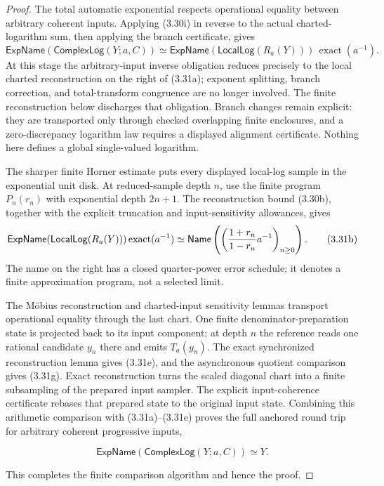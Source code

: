\documentclass[10pt]{article}
\theoremstyle{definition}
\theoremstyle{remark}
\begin{document}
\begin{proof}
The total automatic exponential respects operational equality between
arbitrary coherent inputs.  Applying (3.30i) in reverse to the actual charted-logarithm
sum, then applying the branch certificate, gives
\[
 \mathsf{ExpName}(\mathsf{ComplexLog}(Y;a,C))
 \simeq
 \mathsf{ExpName}(\mathsf{LocalLog}(R_a(Y)))\,\operatorname{exact}(a^{-1}).
 \tag{3.31a}
\]
At this stage the arbitrary-input inverse obligation reduces precisely to the
local charted reconstruction on the right of (3.31a); exponent splitting,
branch correction, and total-transform congruence are no longer involved.
The finite reconstruction below discharges that obligation.  Branch changes
remain explicit: they are transported only through checked overlapping
finite enclosures, and a zero-discrepancy logarithm law requires a displayed
alignment certificate.  Nothing here defines a global single-valued
logarithm.

The sharper finite Horner estimate puts every displayed local-log sample in
the exponential unit disk.  At reduced-sample depth $n$, use the finite
program $P_n(r_n)$ with exponential depth $2n+1$.  The reconstruction bound
(3.30b), together with the explicit truncation and input-sensitivity
allowances, gives
\[
 \mathsf{ExpName}(\mathsf{LocalLog}(R_a(Y)))
       \operatorname{exact}(a^{-1})
 \simeq
 \mathsf{Name}\left(
   \left({1+r_n\over1-r_n}a^{-1}\right)_{n\ge0}
 \right).
 \tag{3.31b}
\]
The name on the right has a closed quarter-power error schedule; it denotes a
finite approximation program, not a selected limit.

The M\"obius reconstruction and charted-input sensitivity lemmas transport
operational equality through the last chart.  One finite
denominator-preparation state is projected back to its input component; at
depth $n$ the reference reads one rational candidate $y_n$ there and emits
$T_a(y_n)$.  The exact synchronized reconstruction lemma gives (3.31e), and
the asynchronous quotient comparison gives (3.31g).  Exact reconstruction
turns the scaled diagonal chart into a finite
subsampling of the prepared input sampler.  The explicit input-coherence
certificate rebases that prepared state to the original input state.  Combining
this arithmetic comparison with (3.31a)--(3.31e) proves the full anchored
round trip for arbitrary coherent progressive inputs,

\[
 \mathsf{ExpName}(\mathsf{ComplexLog}(Y;a,C))\simeq Y.
 \tag{3.31h}
\]

This completes the finite comparison algorithm and hence the proof.
\end{proof}
\end{document}
